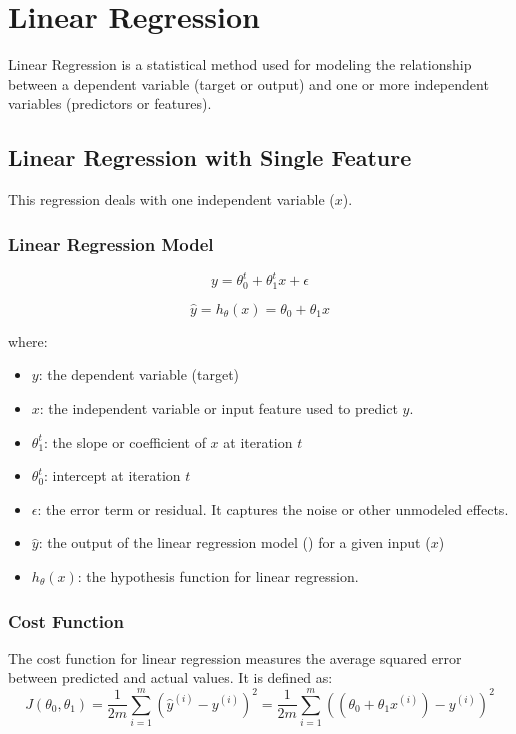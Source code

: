 \chapter{Linear Regression}

Linear Regression is a statistical method used for modeling the relationship between a dependent variable 
(target or output) and one or more independent variables (predictors or features).

\section{Linear Regression with Single Feature}
This regression deals with one independent variable ($x$).

\subsection{Linear Regression Model}

\begin{equation}
y = \theta_0^t + \theta_1^t x + \epsilon
\end{equation}

\begin{equation}
\hat{y} = h_\theta(x) = \theta_0 + \theta_1 x
\end{equation}


\noindent
where:
\begin{itemize}
    \item $y$:  the dependent variable (target)
    \item $x$: the independent variable or input feature used to predict \(y\).
    \item $\theta_1^t$:  the slope or coefficient of \(x\) at iteration \(t\)
    \item $\theta_0^t$: intercept at iteration $t$
    \item $\epsilon$: the error term or residual. It captures the noise or other unmodeled effects.
    \item $\hat{y}$: the output of the linear regression model () for a given input (\(x\))
    \item $h_\theta(x)$: the hypothesis function for linear regression.
\end{itemize}

\subsection{Cost Function}
The cost function for linear regression measures the average squared error between predicted and actual values. It is defined as:
\begin{equation}
J(\theta_0, \theta_1) = \frac{1}{2m} \sum_{i=1}^m \left( \hat{y}^{(i)} - y^{(i)} \right)^2
= \frac{1}{2m} \sum_{i=1}^m \left( (\theta_0 + \theta_1 x^{(i)}) - y^{(i)} \right)^2
\end{equation}

